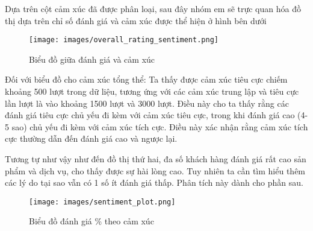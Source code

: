 Dựa trên cột cảm xúc đã được phân loại, sau đây nhóm em sẽ trực quan hóa đồ thị dựa trên chỉ số đánh giá và cảm xúc được thể hiện ở hình bên dưới

\begin{center}
    \begin{figure}[htb] %
        \centering
        \texttt{[image: images/overall\_rating\_sentiment.png]}
        \caption{Biểu đồ giữa đánh giá và cảm xúc}
    \end{figure}
\end{center}

Đối với biểu đồ cho cảm xúc tổng thể: Ta thấy được cảm xúc tiêu cực chiếm khoảng 500 lượt trong dữ liệu, tương ứng với các cảm xúc trung lập và tiêu cực lần lượt là vào khoảng 1500 lượt và 3000 lượt. Điều này cho ta thấy rằng các đánh giá tiêu cực chủ yếu đi kèm với cảm xúc tiêu cực, trong khi đánh giá cao (4-5 sao) chủ yếu đi kèm với cảm xúc tích cực. Điều này xác nhận rằng cảm xúc tích cực thường dẫn đến đánh giá cao và ngược lại.

Tương tự như vậy như đến đồ thị thứ hai, đa số khách hàng đánh giá rất cao sản phẩm và dịch vụ, cho thấy được sự hài lòng cao. Tuy nhiên ta cần tìm hiểu thêm các lý do tại sao vẫn có 1 số ít đánh giá thấp. Phân tích này dành cho phần sau.

\begin{center}
    \begin{figure}[htb] %
        \centering
        \texttt{[image: images/sentiment\_plot.png]}
        \caption{Biểu đồ đánh giá \% theo cảm xúc}
    \end{figure}
\end{center}

